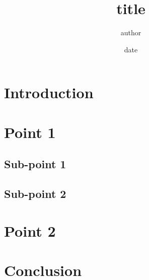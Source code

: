 \documentclass{ec}
\begin{document}
\title{title}
\author{author}
\date{date}

\maketitle
\thesis{}
\tableofcontents

\section{Introduction}

\section{Point 1}

\subsection{Sub-point 1}

\subsection{Sub-point 2}

\section{Point 2}

\section{Conclusion}
\end{document}
